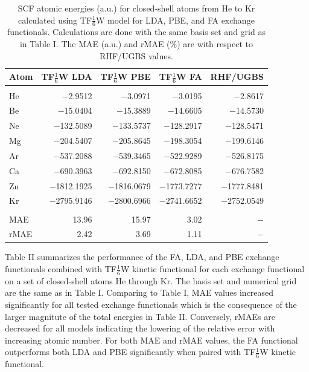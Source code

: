 \documentclass[%
 reprint,
 amsmath,amssymb,
 aps,
pra,
]{revtex4-2}
\begin{document}
\begin{table}[htb]
\caption{SCF atomic energies (a.u.) for closed-shell atoms from He to Kr calculated using TF$\frac{1}{6}$W model for LDA, PBE, and FA exchange functionals. Calculations are done with the same basis set and grid as in Table I. The MAE (a.u.) and rMAE (\%) are with respect to RHF/UGBS values.}
\begin{ruledtabular}
\begin{tabular}{lrrrr}
Atom & TF$\frac{1}{6}$W LDA & TF$\frac{1}{6}$W PBE & TF$\frac{1}{6}$W FA & RHF/UGBS \\[2pt]
\hline\\[-9pt]
He    & $-$2.9512   & $-$3.0971   & $-$3.0195   & $-$2.8617   \\[1.5pt]
Be    & $-$15.0404  & $-$15.3889  & $-$14.6605  & $-$14.5730  \\[1.5pt]
Ne    & $-$132.5089 & $-$133.5737 & $-$128.2917 & $-$128.5471 \\[1.5pt]
Mg    & $-$204.5407 & $-$205.8645 & $-$198.3054 & $-$199.6146 \\[1.5pt]
Ar    & $-$537.2088 & $-$539.3465 & $-$522.9289 & $-$526.8175 \\[1.5pt]
Ca    & $-$690.3963 & $-$692.8150 & $-$672.8085 & $-$676.7582 \\[1.5pt]
Zn    & $-$1812.1925& $-$1816.0679& $-$1773.7277& $-$1777.8481\\[1.5pt]
Kr    & $-$2795.9146& $-$2800.6966& $-$2741.6652& $-$2752.0549\\[1.5pt]
\hline\\[-9pt]
MAE & 13.96 & 15.97 & 3.02 & $-$\\[1.5pt]
rMAE & 2.42 & 3.69 & 1.11 & $-$\\
\end{tabular}
\end{ruledtabular}
\end{table}

Table II summarizes the performance of the FA, LDA, and PBE exchange functionals combined with TF$\frac{1}{6}$W kinetic functional for each exchange functional on a set of closed-shell atoms He through Kr. The basis set and numerical grid are the same as in Table I. Comparing to Table I, MAE values increased significantly for all tested exchange functionals which is the consequence of the larger magnitute of the total energies in Table II. Conversely, rMAEs are decreased for all models indicating the lowering of the relative error with increasing atomic number. For both MAE and rMAE values, the FA functional outperforms both LDA and PBE significantly when paired with TF$\frac{1}{6}$W kinetic functional.
\end{document}

